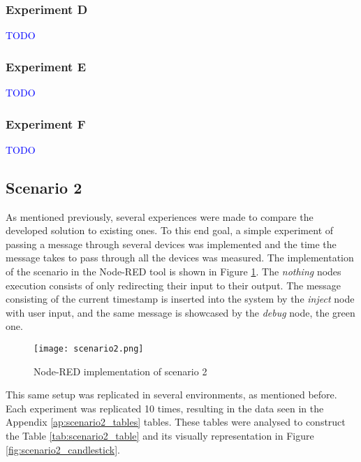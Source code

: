 \subsubsection{Experiment D}

\textcolor{blue}{TODO}


\subsubsection{Experiment E}

\textcolor{blue}{TODO}


\subsubsection{Experiment F}

\textcolor{blue}{TODO}


\subsection{Scenario 2}\label{sec:discussion_scenario2}

As mentioned previously, several experiences were made to compare the developed solution to existing ones. To this end goal, a simple experiment of passing a message through several devices was implemented and the time the message takes to pass through all the devices was measured. The implementation of the scenario in the Node-RED tool is shown in Figure \ref{fig:scenario2_node_red}. The \textit{nothing} nodes execution consists of only redirecting their input to their output. The message consisting of the current timestamp is inserted into the system by the \textit{inject} node with user input, and the same message is showcased by the \textit{debug} node, the green one.

\begin{figure}[h]
\centering
\texttt{[image: scenario2.png]}
\caption[Node-RED implementation of scenario 2]{Node-RED implementation of scenario 2}\label{fig:scenario2_node_red}
\end{figure}

This same setup was replicated in several environments, as mentioned before. Each experiment was replicated 10 times, resulting in the data seen in the Appendix \ref{ap:scenario2_tables} tables. These tables were analysed to construct the Table \ref{tab:scenario2_table} and its visually representation in Figure \ref{fig:scenario2_candlestick}.

